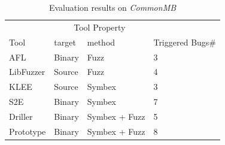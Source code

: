 \begin{table}
  \caption{\label{CommonMB-results}Evaluation results on \textit{CommonMB}}
  \centering
	\begin{tabular}{p{2cm}<{\centering} p{2cm}<{\centering} p{3cm}<{\centering} p{1.5cm}<{\centering}}
		\toprule
		                         & \multicolumn{2}{c}{Tool Property} &  \\
		\cmidrule(r){2-3}
		Tool                     & target   & method                  & Triggered Bugs\# \\ \midrule
		AFL                      & Binary   & Fuzz                    & 3             \\
		LibFuzzer                & Source   & Fuzz                    & 4             \\
		KLEE                     & Source   & Symbex                  & 3             \\
		S2E                      & Binary   & Symbex                  & 7             \\
		Driller                  & Binary   & Symbex + Fuzz           & 5             \\
		Prototype                & Binary   & Symbex + Fuzz           & 8             \\ \bottomrule
	\end{tabular}
\end{table}

